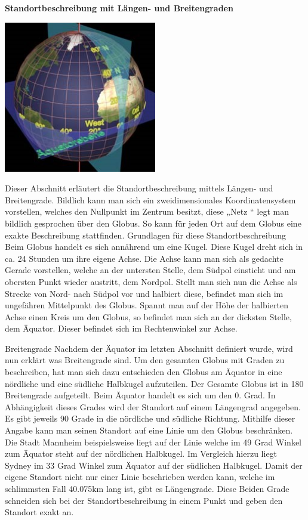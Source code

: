 \textbf{Standortbeschreibung mit Längen- und Breitengraden}

\includegraphics[width=0.50\textwidth]{ref/images/grade.jpg}

Dieser Abschnitt erläutert die Standortbeschreibung mittels Längen- und Breitengrade.
Bildlich kann man sich ein zweidimensionales Koordinatensystem vorstellen, welches den Nullpunkt im Zentrum besitzt, diese „Netz “ legt man bildlich gesprochen über den Globus. So kann für jeden Ort auf dem Globus eine exakte Beschreibung stattfinden. 
Grundlagen für diese Standortbeschreibung
Beim Globus handelt es sich annährend um eine Kugel. Diese Kugel dreht sich in ca. 24 Stunden um ihre eigene Achse. Die Achse kann man sich als gedachte Gerade vorstellen, welche an der untersten Stelle, dem Südpol einsticht und am obersten Punkt wieder austritt, dem Nordpol. Stellt man sich nun die Achse als Strecke von Nord- nach Südpol vor und halbiert diese, befindet man sich im ungefähren Mittelpunkt des Globus. Spannt man auf der Höhe der halbierten Achse einen Kreis um den Globus, so befindet man sich an der dicksten Stelle, dem Äquator. Dieser befindet sich im Rechtenwinkel zur Achse.

Breitengrade
Nachdem der Äquator im letzten Abschnitt definiert wurde, wird nun erklärt was Breitengrade sind. Um den gesamten Globus mit Graden zu beschreiben, hat man sich dazu entschieden den Globus am Äquator in eine nördliche und eine südliche Halbkugel aufzuteilen. Der Gesamte Globus ist in 180 Breitengrade aufgeteilt. Beim Äquator handelt es sich um den 0. Grad. In Abhängigkeit dieses Grades wird der Standort auf einem Längengrad angegeben. Es gibt jeweils 90 Grade in die nördliche und südliche Richtung. Mithilfe dieser Angabe kann man seinen Standort auf eine Linie um den Globus beschränken. Die Stadt Mannheim beispielsweise liegt auf der Linie welche im 49 Grad Winkel zum Äquator steht auf der nördlichen Halbkugel. Im Vergleich hierzu liegt Sydney im 33 Grad Winkel zum Äquator auf der südlichen Halbkugel.
Damit der eigene Standort nicht nur einer Linie beschrieben werden kann, welche im schlimmsten Fall 40.075km lang ist, gibt es Längengrade. Diese Beiden Grade schneiden sich bei der Standortbeschreibung in einem Punkt und geben den Standort exakt an.

